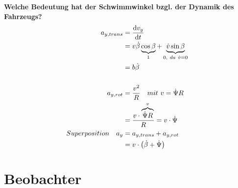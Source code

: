 \subsubsection{}
\textbf{Welche Bedeutung hat der Schwimmwinkel bzgl. der Dynamik des Fahrzeugs?}
\begin{equation}
    \begin{aligned}
        a_{y,trans}            & =\dfrac{\dif v_y}{\dif t}                                                               \\
                               & =v\dot{\beta}\underbrace{\cos\beta}_1+\underbrace{\dot{v}\sin\beta}_{0,\ da\ \dot{v}=0} \\
                               & =b\dot{\beta}                                                                           \\                                                                           \\
        a_{y,rot}              & =\dfrac{v^2}{R}\quad mit\ v=\dot{\Psi}R                                                 \\
                               & =\dfrac{v\cdot\overbrace{\dot{\Psi}R}^v}{R}=v\cdot\dot{\Psi}                            \\
        Superposition\quad a_y & =a_{y,trans}+a_{y,rot}                                                                  \\
                               & =v\cdot\left(\dot{\beta}+\dot{\Psi}\right)
    \end{aligned}
\end{equation}

\section{Beobachter}
